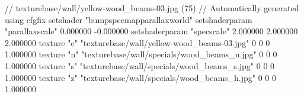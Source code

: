 // texturebase/wall/yellow-wood_beams-03.jpg (75)
// Automatically generated using cfgfix
setshader "bumpspecmapparallaxworld"
setshaderparam "parallaxscale" 0.000000 -0.000000
setshaderparam "specscale" 2.000000 2.000000 2.000000
texture "c" "texturebase/wall/yellow-wood_beams-03.jpg" 0 0 0 1.000000
texture "n" "texturebase/wall/specials/wood_beams_n.jpg" 0 0 0 1.000000
texture "s" "texturebase/wall/specials/wood_beams_s.jpg" 0 0 0 1.000000
texture "z" "texturebase/wall/specials/wood_beams_h.jpg" 0 0 0 1.000000
